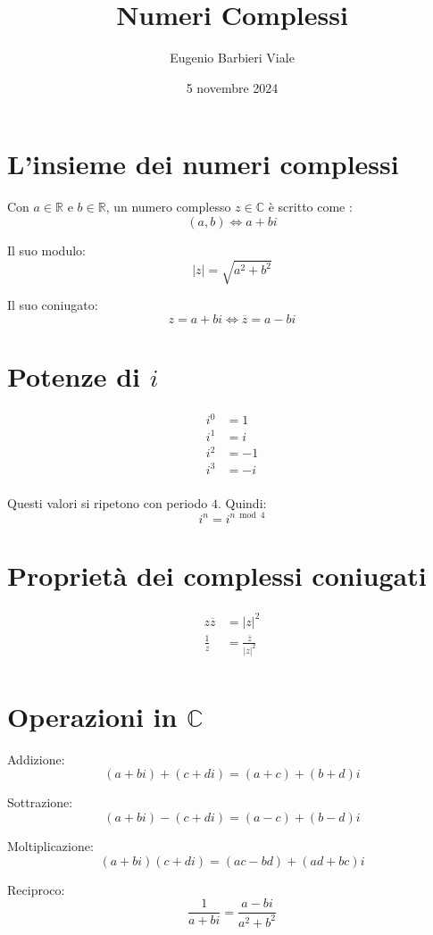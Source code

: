 \documentclass{article}
\title{Numeri Complessi}
\author{Eugenio Barbieri Viale}
\date{5 novembre 2024}
\begin{document}
\setlength{\parindent}{0pt}
\maketitle

\section*{L'insieme dei numeri complessi}

Con $a \in \mathbb{R}$ e $b \in \mathbb{R}$, un numero complesso $z \in \mathbb{C}$ è scritto come :
$$ (a, b) \Longleftrightarrow a + bi $$

Il suo modulo:
$$ |z| = \sqrt{a^2 + b^2} $$

Il suo coniugato:
$$ z = a + bi \Longleftrightarrow \overline{z} = a - bi $$

\section*{Potenze di $i$}
\begin{align*}
i^0 &= 1 \\
i^1 &= i \\
i^2 &= -1 \\
i^3 &= -i \\
\end{align*}

Questi valori si ripetono con periodo $4$. Quindi:
$$ i^n = i^{n \bmod 4} $$

\section*{Proprietà dei complessi coniugati}
\begin{align*}
    z\overline{z} &= |z|^2 \\
    \frac{1}{z} &= \frac{\overline{z}}{|z|^2} \\
\end{align*}


\section*{Operazioni in $\mathbb{C}$}
Addizione:
$$ (a + bi) + (c + di) = (a + c) + (b + d)i $$

\noindent Sottrazione:
$$ (a + bi) - (c + di) = (a - c) + (b - d)i $$

\noindent Moltiplicazione:
$$ (a + bi) (c + di) = (ac - bd) + (ad + bc)i $$

\noindent Reciproco:
$$\frac{1}{a + bi} = \frac{a - bi}{a^2+b^2} $$
\end{document}
